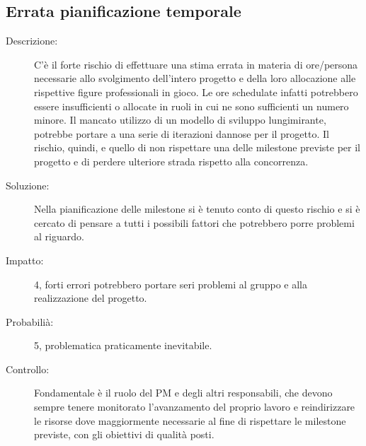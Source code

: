 \subsection{Errata pianificazione temporale}
\begin{description}
\item[Descrizione:] C'è il forte rischio di effettuare una stima errata in materia di ore/persona necessarie allo svolgimento dell'intero progetto e della loro allocazione alle rispettive figure professionali in gioco. Le ore schedulate infatti potrebbero essere
insufficienti o allocate in ruoli in cui ne sono sufficienti un numero minore. Il mancato utilizzo
di un modello di sviluppo lungimirante, potrebbe portare a una serie di
iterazioni dannose per il progetto. Il rischio, quindi, e quello di non rispettare una
delle milestone previste per il progetto e di perdere ulteriore strada rispetto alla concorrenza.
\item[Soluzione:] Nella pianificazione delle milestone si è tenuto conto di questo rischio e si è
cercato di pensare a tutti i possibili fattori che potrebbero porre problemi al riguardo.
\item[Impatto:] 4, forti errori potrebbero portare seri problemi al gruppo e alla realizzazione del progetto.
\item[Probabilià:] 5, problematica praticamente inevitabile.
\item[Controllo:] Fondamentale è il ruolo del PM e degli altri responsabili, che devono sempre
tenere monitorato l'avanzamento del proprio lavoro e reindirizzare le risorse
dove maggiormente necessarie al fine di rispettare le milestone previste, con gli
obiettivi di qualità posti.
\end{description}

